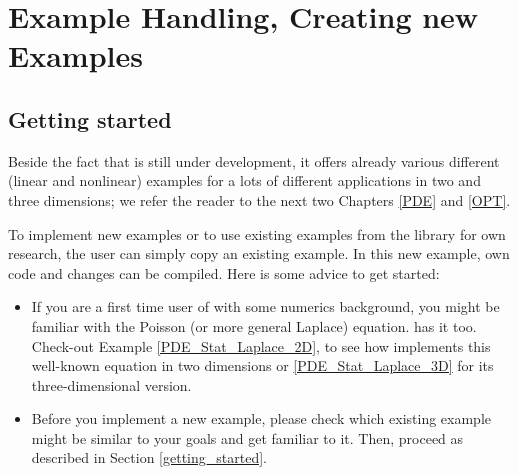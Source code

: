 \chapter{Example Handling, Creating new Examples}
\label{chap:howtoex}
\section{Getting started}
Beside the fact that \dope{} is still under development,
it offers already various different (linear and nonlinear) 
examples for a lots 
of different applications in two and three dimensions; 
we refer the reader to the 
next two Chapters \ref{PDE} and \ref{OPT}. 

To implement new examples or to use existing examples 
from the library for own research, the user 
can simply copy an existing example. In this 
new example, own code and changes can be compiled. Here is some 
advice to get started:
\begin{itemize}
\item If you are a first time user of \dope{} 
with some numerics background, you 
might be familiar with the Poisson (or more general Laplace) equation.
\dope{} has it too. Check-out Example \ref{PDE_Stat_Laplace_2D},
to see how \dope{} implements this well-known equation in two
dimensions or \ref{PDE_Stat_Laplace_3D} for its three-dimensional version.
\item Before you implement a new example, please check which 
existing example might be similar to your goals and get familiar 
to it. Then, proceed as described in Section \ref{getting_started}. 
\end{itemize}

